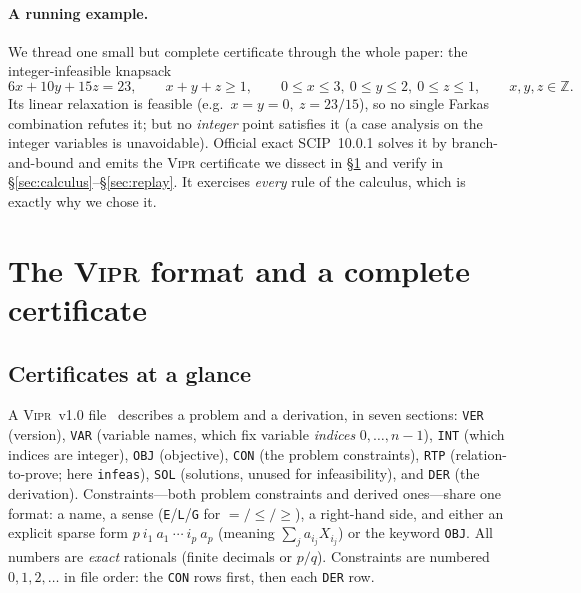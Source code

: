 \documentclass[runningheads]{llncs}
\newcommand{\code}[1]{\texttt{#1}}
\newcommand{\Z}{\mathbb{Z}}
\newcommand{\scip}{\textsc{SCIP}}
\newcommand{\vipr}{\textsc{Vipr}}
\begin{document}
\paragraph{A running example.} We thread one small but complete certificate through the
whole paper: the integer-infeasible knapsack
\begin{equation}\label{eq:knap}
6x+10y+15z=23,\qquad x+y+z\ge1,\qquad 0\le x\le3,\ 0\le y\le2,\ 0\le z\le1,\qquad x,y,z\in\Z.
\end{equation}
Its linear relaxation is feasible (e.g.\ $x{=}y{=}0,\ z{=}23/15$), so no single Farkas
combination refutes it; but no \emph{integer} point satisfies it (a case analysis on the
integer variables is unavoidable). Official exact \scip{}~10.0.1 solves it by
branch-and-bound and emits the \vipr{} certificate we dissect in \S\ref{sec:format} and
verify in \S\ref{sec:calculus}--\S\ref{sec:replay}. It exercises \emph{every} rule of the
calculus, which is exactly why we chose it.

\section{The \vipr{} format and a complete certificate}\label{sec:format}

\subsection{Certificates at a glance}
A \vipr~v1.0 file~\cite{vipr} describes a problem and a derivation, in seven sections:
\code{VER} (version), \code{VAR} (variable names, which fix variable \emph{indices}
$0,\dots,n{-}1$), \code{INT} (which indices are integer), \code{OBJ} (objective),
\code{CON} (the problem constraints), \code{RTP} (relation-to-prove; here
\code{infeas}), \code{SOL} (solutions, unused for infeasibility), and \code{DER} (the
derivation). Constraints---both problem constraints and derived ones---share one format:
a name, a sense (\code{E}/\code{L}/\code{G} for $=/\le/\ge$), a right-hand side, and
either an explicit sparse form $p\ i_1\ a_1\ \cdots\ i_p\ a_p$ (meaning
$\sum_j a_{i_j}X_{i_j}$) or the keyword \code{OBJ}. All numbers are \emph{exact}
rationals (finite decimals or $p/q$). Constraints are numbered $0,1,2,\dots$ in file
order: the \code{CON} rows first, then each \code{DER} row.
\end{document}

